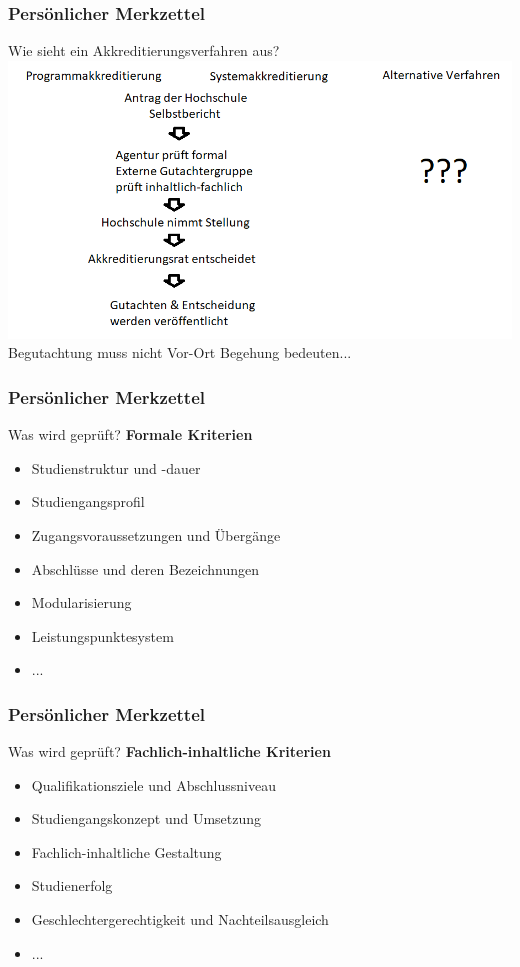 \documentclass[german,10pt,xcolor=colortbl,compress]{beamer}
\begin{document}
\begin{frame}
\frametitle{Persönlicher Merkzettel}
Wie sieht ein Akkreditierungsverfahren aus?
\vspace{0.5cm}
  \includegraphics[width=1\textwidth]{verfahren.png}\\
Begutachtung muss nicht Vor-Ort Begehung bedeuten...
\end{frame}
\begin{frame}
\frametitle{Persönlicher Merkzettel}
Was wird geprüft?
\vspace{0.5cm}
\textbf{Formale Kriterien}
\begin{itemize}
\item Studienstruktur und -dauer
\item Studiengangsprofil
\item Zugangsvoraussetzungen und Übergänge
\item Abschlüsse und deren Bezeichnungen
\item Modularisierung
\item Leistungspunktesystem
\item ...
\end{itemize}
\end{frame}
\begin{frame}
\frametitle{Persönlicher Merkzettel}
Was wird geprüft?
\vspace{0.5cm}
\textbf{Fachlich-inhaltliche Kriterien}
\begin{itemize}
\item Qualifikationsziele und Abschlussniveau
\item Studiengangskonzept und Umsetzung
\item Fachlich-inhaltliche Gestaltung
\item Studienerfolg
\item Geschlechtergerechtigkeit und Nachteilsausgleich
\item ...
\end{itemize}
\end{frame}
\end{document}
